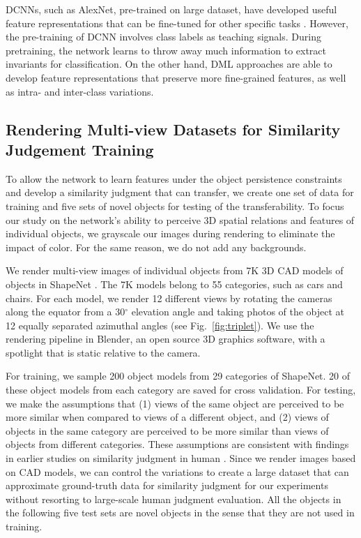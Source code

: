 \documentclass{article} %
\begin{document}
DCNNs, such as AlexNet, pre-trained on large dataset, have developed useful feature representations that can be fine-tuned for other specific tasks \citep{donahue2014decaf,qian2015fine,karpathy2014large}. However, the pre-training of DCNN involves class labels as teaching signals. During pretraining, the network learns to throw away much information to extract invariants for classification.  On the other hand, DML approaches are able to develop feature representations that preserve more fine-grained features, as well as intra- and inter-class variations.

\subsection{Rendering Multi-view Datasets for Similarity Judgement Training}
To allow the network to learn features under the object persistence constraints and develop a similarity judgment that can transfer, we create one set of data for training and five sets of novel objects for testing of the transferability. To focus our study on the network's ability to perceive 3D spatial relations and features of individual objects, we grayscale our images during rendering to eliminate the impact of color. For the same reason, we do not add any backgrounds.

We render multi-view images of individual objects from 7K 3D CAD models of objects in ShapeNet \citep{DBLP:journals/corr/ChangFGHHLSSSSX15}. The 7K models belong to 55 categories, such as cars and chairs. For each model, we render 12 different views by rotating the cameras along the equator from a 30$^\circ$ elevation angle and taking photos of the object at 12 equally separated azimuthal angles (see Fig.~\ref{fig:triplet}).  We use the rendering pipeline in Blender, an open source 3D graphics software, with a spotlight that is static relative to the camera.

For training, we sample 200 object models from 29 categories of ShapeNet. 20 of these object models from each category are saved for cross validation. For testing, we make the assumptions that (1) views of the same object are perceived to be more similar when compared to views of a different object, and (2) views of objects in the same category are perceived to be more similar than views of objects from different categories. These assumptions are consistent with findings in earlier studies on similarity judgment in human %
\citep{quiroga2005invariant,erdogan2014transfer,similarity2013}. Since we render images based on CAD models, we can control the variations to create a large dataset that can approximate ground-truth data for similarity judgment for our experiments  without resorting to large-scale human judgment evaluation.
All the objects in  the following five test sets are novel objects in the sense that they are not used in training.
\end{document}
